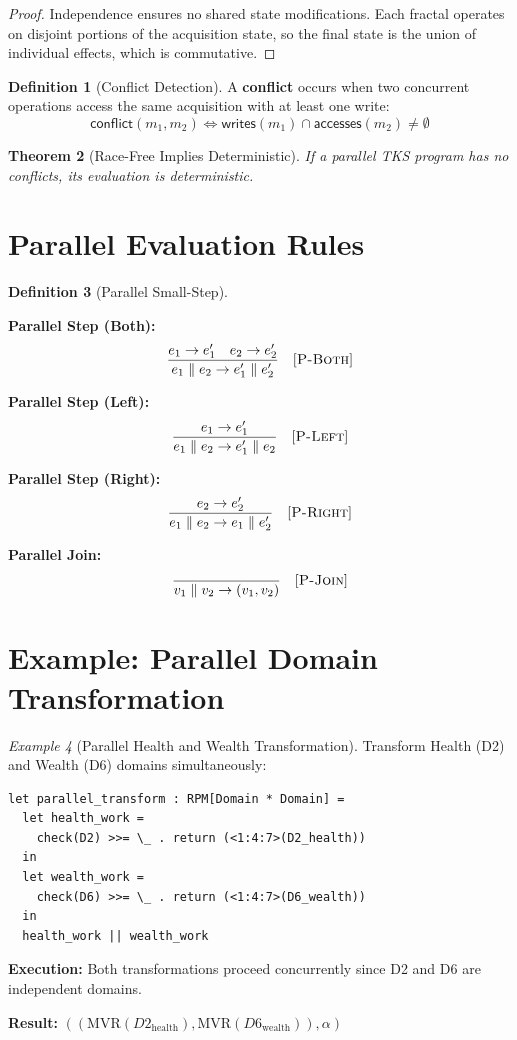 \documentclass[11pt,twoside,openright]{book}
\theoremstyle{definition}
\newtheorem{definition}{Definition}[chapter]
\theoremstyle{plain}
\newtheorem{theorem}[definition]{Theorem}
\theoremstyle{remark}
\newtheorem{example}[definition]{Example}
\newcommand{\smallstep}{\to}
\newcommand{\pcomp}{\parallel}
\begin{document}
\begin{proof}
Independence ensures no shared state modifications. Each fractal operates on disjoint portions of the acquisition state, so the final state is the union of individual effects, which is commutative.
\end{proof}

\begin{definition}[Conflict Detection]
\label{def:conflict-detection}
A \textbf{conflict} occurs when two concurrent operations access the same acquisition with at least one write:
\[
\mathsf{conflict}(m_1, m_2) \iff \mathsf{writes}(m_1) \cap \mathsf{accesses}(m_2) \neq \emptyset
\]
\end{definition}

\begin{theorem}[Race-Free Implies Deterministic]
\label{thm:race-free}
If a parallel TKS program has no conflicts, its evaluation is deterministic.
\end{theorem}

\section{Parallel Evaluation Rules}

\begin{definition}[Parallel Small-Step]
\label{def:parallel-smallstep}

\textbf{Parallel Step (Both):}
\[
\frac{e_1 \smallstep e_1' \quad e_2 \smallstep e_2'}
{e_1 \pcomp e_2 \smallstep e_1' \pcomp e_2'} \quad [\textsc{P-Both}]
\]

\textbf{Parallel Step (Left):}
\[
\frac{e_1 \smallstep e_1'}
{e_1 \pcomp e_2 \smallstep e_1' \pcomp e_2} \quad [\textsc{P-Left}]
\]

\textbf{Parallel Step (Right):}
\[
\frac{e_2 \smallstep e_2'}
{e_1 \pcomp e_2 \smallstep e_1 \pcomp e_2'} \quad [\textsc{P-Right}]
\]

\textbf{Parallel Join:}
\[
\frac{}
{v_1 \pcomp v_2 \smallstep (v_1, v_2)} \quad [\textsc{P-Join}]
\]
\end{definition}

\section{Example: Parallel Domain Transformation}

\begin{example}[Parallel Health and Wealth Transformation]
\label{ex:parallel-transform}
Transform Health (D2) and Wealth (D6) domains simultaneously:

\begin{verbatim}
let parallel_transform : RPM[Domain * Domain] =
  let health_work =
    check(D2) >>= \_ . return (<1:4:7>(D2_health))
  in
  let wealth_work =
    check(D6) >>= \_ . return (<1:4:7>(D6_wealth))
  in
  health_work || wealth_work
\end{verbatim}

\textbf{Execution:} Both transformations proceed concurrently since D2 and D6 are independent domains.

\textbf{Result:} $((\text{MVR}(D2_{\text{health}}), \text{MVR}(D6_{\text{wealth}})), \alpha)$
\end{example}
\end{document}
